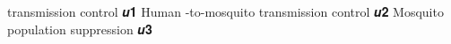 transmission control 𝒖𝟏 Human -to-mosquito
transmission control 𝒖𝟐 Mosquito population
suppression 𝒖𝟑
